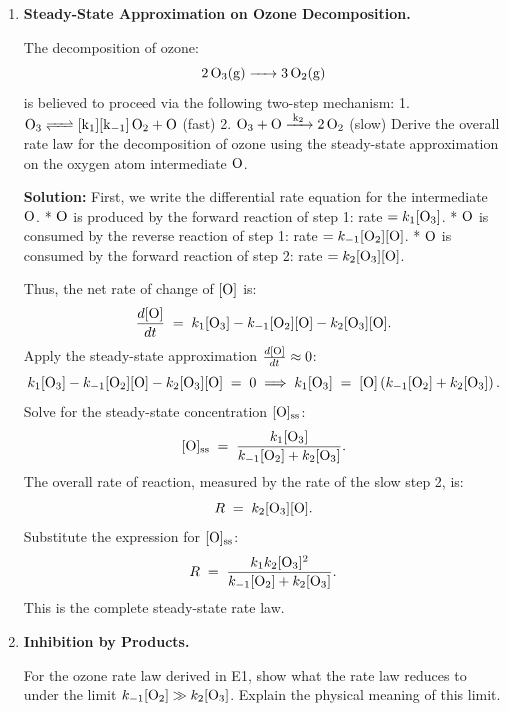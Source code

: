 \documentclass[12pt, a4paper]{book}
\begin{document}
\begin{problembox}
\begin{enumerate}[label=\textbf{E\arabic*.}]
  \item \textbf{Steady-State Approximation on Ozone Decomposition.}
  
        The decomposition of ozone:
        \[
          \ce{2 O3(g) -> 3 O2(g)}
        \]
        is believed to proceed via the following two-step mechanism:
        1. $\ce{O3 <=> [k_1][k_{-1}] O2 + O}$ (fast)
        2. $\ce{O3 + O ->[k_2] 2 O2}$ (slow)
        Derive the overall rate law for the decomposition of ozone using the steady-state approximation on the oxygen atom intermediate $\ce{O}$.
        
        \textbf{Solution:}
        First, we write the differential rate equation for the intermediate $\ce{O}$.
        * $\ce{O}$ is produced by the forward reaction of step 1: rate $= k_1 [\ce{O3}]$.
        * $\ce{O}$ is consumed by the reverse reaction of step 1: rate $= k_{-1} [\ce{O2}][\ce{O}]$.
        * $\ce{O}$ is consumed by the forward reaction of step 2: rate $= k_2 [\ce{O3}][\ce{O}]$.
        
        Thus, the net rate of change of $[\ce{O}]$ is:
        \[
          \frac{d[\ce{O}]}{dt} \;=\; k_1 [\ce{O3}] - k_{-1} [\ce{O2}][\ce{O}] - k_2 [\ce{O3}][\ce{O}].
        \]
        Apply the steady-state approximation $\frac{d[\ce{O}]}{dt} \approx 0$:
        \[
          k_1 [\ce{O3}] - k_{-1} [\ce{O2}][\ce{O}] - k_2 [\ce{O3}][\ce{O}] \;=\; 0 \implies k_1 [\ce{O3}] \;=\; [\ce{O}] \left( k_{-1} [\ce{O2}] + k_2 [\ce{O3}] \right).
        \]
        Solve for the steady-state concentration $[\ce{O}]_{\text{ss}}$:
        \[
          [\ce{O}]_{\text{ss}} \;=\; \frac{k_1 [\ce{O3}]}{k_{-1} [\ce{O2}] + k_2 [\ce{O3}]}.
        \]
        The overall rate of reaction, measured by the rate of the slow step 2, is:
        \[
          R \;=\; k_2 [\ce{O3}][\ce{O}].
        \]
        Substitute the expression for $[\ce{O}]_{\text{ss}}$:
        \[
          R \;=\; \frac{k_1 k_2 [\ce{O3}]^2}{k_{-1} [\ce{O2}] + k_2 [\ce{O3}]}.
        \]
        This is the complete steady-state rate law.
        
  \item \textbf{Inhibition by Products.}
  
        For the ozone rate law derived in E1, show what the rate law reduces to under the limit $k_{-1}[\ce{O2}] \gg k_2[\ce{O3}]$. Explain the physical meaning of this limit.
        

\end{enumerate}
\end{problembox}
\end{document}
